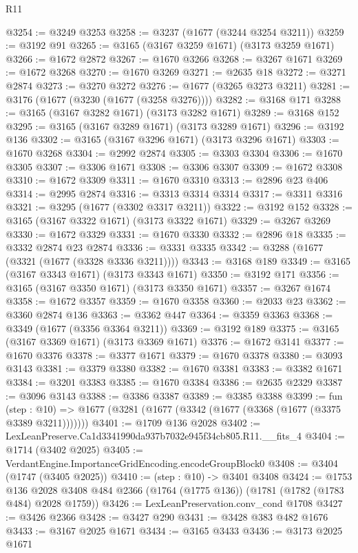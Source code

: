 \begin{lexlean}{R11}
\begin{coremodule}
@3254 := @3249 @3253
@3258 := @3237 (@1677 (@3244 @3254 @3211))
@3259 := @3192 @91
@3265 := @3165 (@3167 @3259 @1671) (@3173 @3259 @1671)
@3266 := @1672 @2872
@3267 := @1670 @3266
@3268 := @3267 @1671
@3269 := @1672 @3268
@3270 := @1670 @3269
@3271 := @2635 @18
@3272 := @3271 @2874
@3273 := @3270 @3272
@3276 := @1677 (@3265 @3273 @3211)
@3281 := @3176 (@1677 (@3230 (@1677 (@3258 @3276))))
@3282 := @3168 @171
@3288 := @3165 (@3167 @3282 @1671) (@3173 @3282 @1671)
@3289 := @3168 @152
@3295 := @3165 (@3167 @3289 @1671) (@3173 @3289 @1671)
@3296 := @3192 @136
@3302 := @3165 (@3167 @3296 @1671) (@3173 @3296 @1671)
@3303 := @1670 @3268
@3304 := @2992 @2874
@3305 := @3303 @3304
@3306 := @1670 @3305
@3307 := @3306 @1671
@3308 := @3306 @3307
@3309 := @1672 @3308
@3310 := @1672 @3309
@3311 := @1670 @3310
@3313 := @2896 @23 @406
@3314 := @2995 @2874
@3316 := @3313 @3314 @3314
@3317 := @3311 @3316
@3321 := @3295 (@1677 (@3302 @3317 @3211))
@3322 := @3192 @152
@3328 := @3165 (@3167 @3322 @1671) (@3173 @3322 @1671)
@3329 := @3267 @3269
@3330 := @1672 @3329
@3331 := @1670 @3330
@3332 := @2896 @18
@3335 := @3332 @2874 @23 @2874
@3336 := @3331 @3335
@3342 := @3288 (@1677 (@3321 (@1677 (@3328 @3336 @3211))))
@3343 := @3168 @189
@3349 := @3165 (@3167 @3343 @1671) (@3173 @3343 @1671)
@3350 := @3192 @171
@3356 := @3165 (@3167 @3350 @1671) (@3173 @3350 @1671)
@3357 := @3267 @1674
@3358 := @1672 @3357
@3359 := @1670 @3358
@3360 := @2033 @23
@3362 := @3360 @2874 @136
@3363 := @3362 @447
@3364 := @3359 @3363
@3368 := @3349 (@1677 (@3356 @3364 @3211))
@3369 := @3192 @189
@3375 := @3165 (@3167 @3369 @1671) (@3173 @3369 @1671)
@3376 := @1672 @3141
@3377 := @1670 @3376
@3378 := @3377 @1671
@3379 := @1670 @3378
@3380 := @3093 @3143
@3381 := @3379 @3380
@3382 := @1670 @3381
@3383 := @3382 @1671
@3384 := @3201 @3383
@3385 := @1670 @3384
@3386 := @2635 @2329
@3387 := @3096 @3143
@3388 := @3386 @3387
@3389 := @3385 @3388
@3399 := fun (step : @10) =>
  @1677 (@3281 (@1677 (@3342 (@1677 (@3368 (@1677 (@3375 @3389 @3211)))))))
@3401 := @1709 @136 @2028
@3402 := LexLeanPreserve.Ca1d3341990da937b7032e945f34cb805.R11.__fits_4
@3404 := @1714 (@3402 @2025)
@3405 := VerdantEngine.ImportanceGridEncoding.encodeGroupBlock0
@3408 := @3404 (@1747 (@3405 @2025))
@3410 := (step : @10) -> @3401 @3408
@3424 := @1753
    @136
    @2028
    @3408
    @484
    @2366
    (@1764 (@1775 @136))
    (@1781 (@1782 (@1783 @484) @2028 @1759))
@3426 := LexLeanPreservation.conv_cond @1708
@3427 := @3426 @2366
@3428 := @3427 @290
@3431 := @3428 @383 @482 @1676
@3433 := @3167 @2025 @1671
@3434 := @3165 @3433
@3436 := @3173 @2025 @1671

\end{coremodule}
\end{lexlean}
